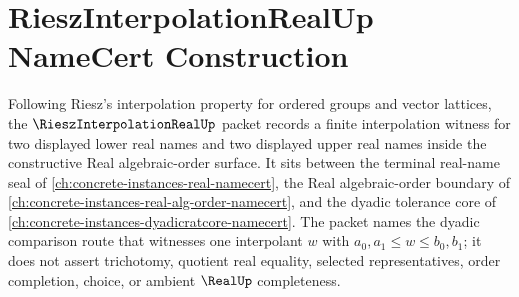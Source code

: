 \chapter{RieszInterpolationRealUp NameCert Construction}
\label{ch:concrete-instances-riesz-interpolation-real-namecert}

Following Riesz's interpolation property for ordered groups and vector lattices, the $\RieszInterpolationRealUp$ packet records a finite interpolation witness for two displayed lower real names and two displayed upper real names inside the constructive Real algebraic-order surface. It sits between the terminal real-name seal of \autoref{ch:concrete-instances-real-namecert}, the Real algebraic-order boundary of \autoref{ch:concrete-instances-real-alg-order-namecert}, and the dyadic tolerance core of \autoref{ch:concrete-instances-dyadicratcore-namecert}. The packet names the dyadic comparison route that witnesses one interpolant $w$ with $a_{0},a_{1}\leq w\leq b_{0},b_{1}$; it does not assert trichotomy, quotient real equality, selected representatives, order completion, choice, or ambient $\RealUp$ completeness.

